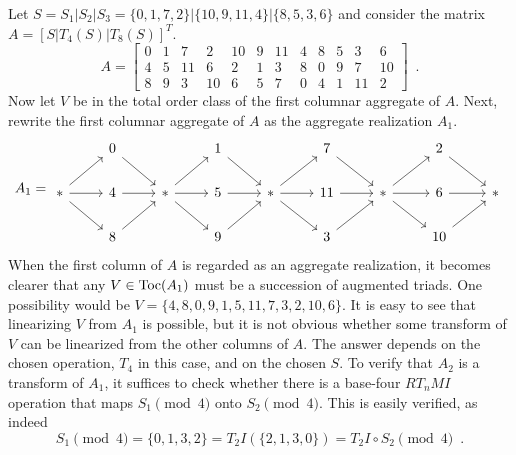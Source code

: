\begin{example}
    \cite[226, 227]{Starr1984}
    \label{ex:starr-aggregate-realization}
    Let $S = S_1 | S_2 | S_3 = \{ 0, 1, 7, 2 \} | \{ 10, 9, 11, 4 \} | \{ 8, 5, 3, 6 \}$ and consider the matrix $A = [S | T_4(S) | T_8(S)]^T$.
    \begin{equation}
        A = \left[
        \begin{array}{cccc|cccc|cccc}
        	0 & 1 & 7 & 2 & 10 & 9 & 11 & 4 & 8 & 5 & 3 & 6 \\
        	4 & 5 & 11 & 6 & 2 & 1 & 3 & 8 & 0 & 9 & 7 & 10 \\
        	8 & 9 & 3 & 10 & 6 & 5 & 7 & 0 & 4 & 1 & 11 & 2
        \end{array}
        \right] \enspace.
    \end{equation}
    Now let $V$ be in the total order class of the first columnar aggregate of $A$. Next, rewrite the first columnar aggregate of $A$ as the aggregate realization $A_1$.
    \begin{equation}
        A_1 = \begin{tikzcd}
            & 0 \arrow[dr] && 1 \arrow[dr] && 7 \arrow[dr] && 2 \arrow[dr] & \\
            * \arrow[r] \arrow[dr] \arrow[ur] & 4 \arrow[r] & * \arrow[r] \arrow[dr] \arrow[ur] & 5 \arrow[r] & * \arrow[r] \arrow[dr] \arrow[ur] & 11 \arrow[r] & * \arrow[r] \arrow[dr] \arrow[ur] & 6 \arrow[r] & * \\
            & 8 \arrow[ur] && 9 \arrow[ur] && 3 \arrow[ur] && 10 \arrow[ur] &
        \end{tikzcd}
    \end{equation}
    When the first column of $A$ is regarded as an aggregate realization, it becomes clearer that any $V \in \operatorname{Toc}(A_1)$ must be a succession of augmented triads. One possibility would be $V = \{ 4, 8, 0, 9, 1, 5, 11, 7, 3, 2, 10, 6 \}$. It is easy to see that linearizing $V$ from $A_1$ is possible, but it is not obvious whether some transform of $V$ can be linearized from the other columns of $A$. The answer depends on the chosen operation, $T_4$ in this case, and on the chosen $S$. To verify that $A_2$ is a transform of $A_1$, it suffices to check whether there is a base-four $RT_nMI$ operation that maps $S_1 \pmod 4$ onto $S_2 \pmod 4$. This is easily verified, as indeed
    \begin{equation}
        S_1 \pmod 4 = \{ 0, 1, 3, 2 \} = T_2I(\{ 2, 1, 3, 0 \}) = T_2I \circ S_2 \pmod 4 \enspace.

\end{equation}
\end{example}
